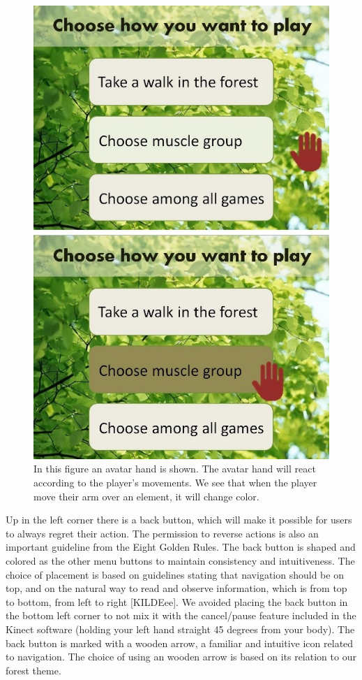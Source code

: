 \begin{figure} [H]
\centering
\includegraphics[scale=0.5]{menuAction.jpg}
\caption[Menu - Action and response]{In this figure an avatar hand is shown. The avatar hand will react according to the player's movements. We see that when the player move their arm over an element, it will change color.}
\label{fig:avatarAction}
\end{figure} 

Up in the left corner there is a back button, which will make it possible for users to always regret their action. The permission to reverse actions is also an important guideline from the Eight Golden Rules. The back button is shaped and colored as the other menu buttons to maintain consistency and intuitiveness. The choice of placement is based on guidelines stating that navigation should be on top, and on the natural way to read and observe information, which is from top to bottom, from left to right [KILDEee]. We avoided placing the back button in the bottom left corner to not mix it with the cancel/pause feature included in the Kinect software (holding your left hand straight 45 degrees from your body). The back button is marked with a wooden arrow, a familiar and intuitive icon related to navigation. The choice of using an wooden arrow is based on its relation to our forest theme. 

